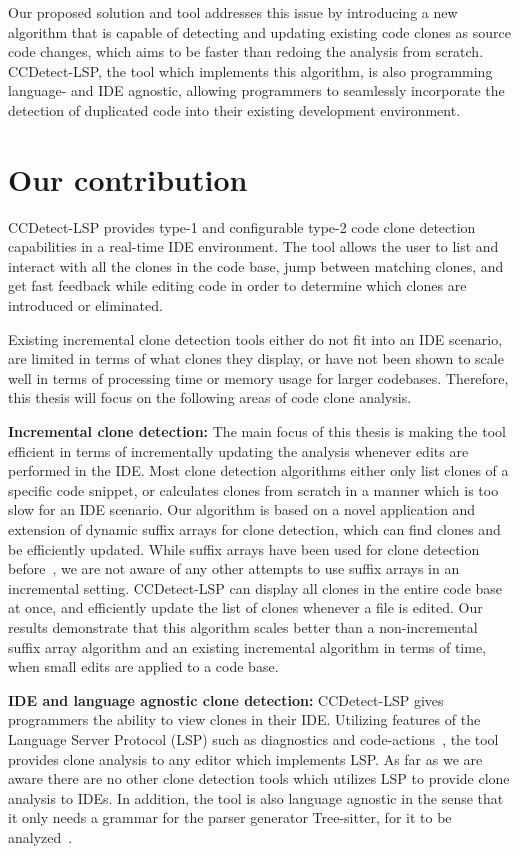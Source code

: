 Our proposed solution and tool addresses this issue by introducing a new algorithm that is
capable of detecting and updating existing code clones as source code changes, which aims
to be faster than redoing the analysis from scratch. CCDetect-LSP, the tool which
implements this algorithm, is also programming language- and IDE agnostic, allowing
programmers to seamlessly incorporate the detection of duplicated code into their existing
development environment.

\section{Our contribution}

CCDetect-LSP provides type-1 and configurable type-2 code clone detection capabilities in
a real-time IDE environment. The tool allows the user to list and interact with all the
clones in the code base, jump between matching clones, and get fast feedback while editing
code in order to determine which clones are introduced or eliminated.

Existing incremental clone detection tools either do not fit into an IDE scenario, are
limited in terms of what clones they display, or have not been shown to scale well in
terms of processing time or memory usage for larger codebases. Therefore, this thesis will
focus on the following areas of code clone analysis.

\textbf{Incremental clone detection:} The main focus of this thesis is making the tool
efficient in terms of incrementally updating the analysis whenever edits are performed in
the IDE. Most clone detection algorithms either only list clones of a specific code
snippet, or calculates clones from scratch in a manner which is too slow for an IDE
scenario. Our algorithm is based on a novel application and extension of dynamic suffix
arrays for clone detection, which can find clones and be efficiently updated. While suffix
arrays have been used for clone detection before~\cite{SHINOBI}, we are not aware of any
other attempts to use suffix arrays in an incremental setting. CCDetect-LSP can display
all clones in the entire code base at once, and efficiently update the list of clones
whenever a file is edited. Our results demonstrate that this algorithm scales better than
a non-incremental suffix array algorithm and an existing incremental algorithm in terms of
time, when small edits are applied to a code base.

\textbf{IDE and language agnostic clone detection:} CCDetect-LSP gives programmers the
ability to view clones in their IDE. Utilizing features of the Language Server Protocol
(LSP) such as diagnostics and code-actions~\cite{lsp}, the tool provides clone analysis to
any editor which implements LSP. As far as we are aware there are no other clone detection
tools which utilizes LSP to provide clone analysis to IDEs. In addition, the tool is also
language agnostic in the sense that it only needs a grammar for the parser generator
Tree-sitter, for it to be analyzed~\cite{treesitter}. 

